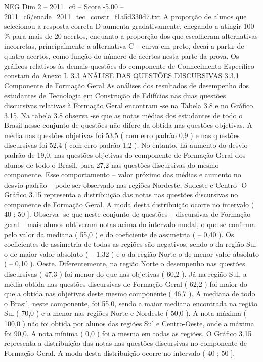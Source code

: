 \begin{textsample}{NEG Dim 2 – 2011\_c6 – Score -5.00 – 2011\_c6/enade\_2011\_tec\_constr\_f1a5d330d7.txt}
A proporção de alunos que selecionou a resposta correta D aumenta gradativamente, chegando a atingir 100 \% para mais de 20 acertos, enquanto a proporção dos que escolheram alternativas incorretas, principalmente a alternativa C – curva em preto, decai a partir de quatro acertos, como função do número de acertos nesta parte da prova.
Os gráficos relativos às demais questões do componente de Conhecimento Específico constam do Anexo I. 3.3 ANÁLISE DAS QUESTÕES DISCURSIVAS 3.3.1 Componente de Formação Geral As análises dos resultados de desempenho dos estudantes de Tecnologia em Construção de Edifícios nas duas questões discursivas relativas à Formação Geral encontram -se na Tabela 3.8 e no Gráfico 3.15.
Na tabela 3.8 observa -se que as notas médias dos estudantes de todo o Brasil nesse conjunto de questões não difere da obtida nas questões objetivas.
A média nas questões objetivas foi 53,5 ( com erro padrão 0,9 ) e nas questões discursivas foi 52,4 ( com erro padrão 1,2 ).
No entanto, há aumento do desvio padrão de 19,0, nas questões objetivas do componente de Formação Geral dos alunos de todo o Brasil, para 27,2 nas questões discursivas do mesmo componente.
Esse comportamento – valor próximo das médias e aumento no desvio padrão – pode ser observado nas regiões Nordeste, Sudeste e Centro- O Gráfico 3.15 representa a distribuição das notas nas questões discursivas no componente de Formação Geral.
A moda desta distribuição ocorre no intervalo ( 40 ; 50 ].
Observa -se que neste conjunto de questões – discursivas de Formação geral – mais alunos obtiveram notas acima do intervalo modal, o que se confirma pelo valor da mediana ( 55,0 ) e do coeficiente de assimetria ( – 0,40 ).
Os coeficientes de assimetria de todas as regiões são negativos, sendo o da região Sul o de maior valor absoluto ( – 1,32 ) e o da região Norte o de menor valor absoluto ( – 0,10 ).
Oeste.
Diferentemente, na região Norte o desempenho nas questões discursivas ( 47,3 ) foi menor do que nas objetivas ( 60,2 ).
Já na região Sul, a média obtida nas questões discursivas de Formação Geral ( 62,2 ) foi maior do que a obtida nas objetivas deste mesmo componente ( 46,7 ).
A mediana de todo o Brasil, neste componente, foi 55,0, sendo a maior mediana encontrada na região Sul ( 70,0 ) e a menor nas regiões Norte e Nordeste ( 50,0 ).
A nota máxima ( 100,0 ) não foi obtida por alunos das regiões Sul e Centro-Oeste, onde a máxima foi 90,0.
A nota mínima ( 0,0 ) foi a mesma em todas as regiões.
O Gráfico 3.15 representa a distribuição das notas nas questões discursivas no componente de Formação Geral.
A moda desta distribuição ocorre no intervalo ( 40 ; 50 ].

\end{textsample}
